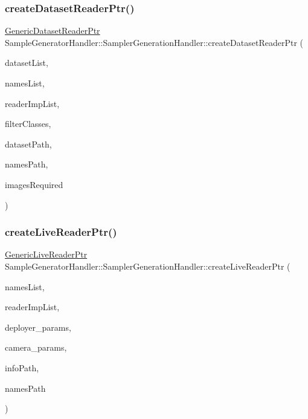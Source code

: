 \subsubsection{\texorpdfstring{create\+Dataset\+Reader\+Ptr()}{createDatasetReaderPtr()}}
{\footnotesize\ttfamily \hyperlink{_generic_dataset_reader_8h_aee69804c49b311360ba65543d4111f58}{Generic\+Dataset\+Reader\+Ptr} Sample\+Generator\+Handler\+::\+Sampler\+Generation\+Handler\+::create\+Dataset\+Reader\+Ptr (\begin{DoxyParamCaption}\item[{const Q\+List\+View $\ast$}]{dataset\+List,  }\item[{const Q\+List\+View $\ast$}]{names\+List,  }\item[{const Q\+List\+View $\ast$}]{reader\+Imp\+List,  }\item[{const Q\+List\+View $\ast$}]{filter\+Classes,  }\item[{const std\+::string \&}]{dataset\+Path,  }\item[{const std\+::string \&}]{names\+Path,  }\item[{const bool}]{images\+Required }\end{DoxyParamCaption})\hspace{0.3cm}{\ttfamily [static]}}

\mbox{\label{class_sample_generator_handler_1_1_sampler_generation_handler_ad840c7f9b5a3281f62829933308e7e18}} 
\subsubsection{\texorpdfstring{create\+Live\+Reader\+Ptr()}{createLiveReaderPtr()}}
{\footnotesize\ttfamily \hyperlink{_generic_live_reader_8h_ad27d78f1cc13a4eb75ca3d14b6188a1a}{Generic\+Live\+Reader\+Ptr} Sample\+Generator\+Handler\+::\+Sampler\+Generation\+Handler\+::create\+Live\+Reader\+Ptr (\begin{DoxyParamCaption}\item[{const Q\+List\+View $\ast$}]{names\+List,  }\item[{const Q\+List\+View $\ast$}]{reader\+Imp\+List,  }\item[{const Q\+Group\+Box $\ast$}]{deployer\+\_\+params,  }\item[{const Q\+Group\+Box $\ast$}]{camera\+\_\+params,  }\item[{const std\+::string \&}]{info\+Path,  }\item[{const std\+::string \&}]{names\+Path }\end{DoxyParamCaption})\hspace{0.3cm}{\ttfamily [static]}}



